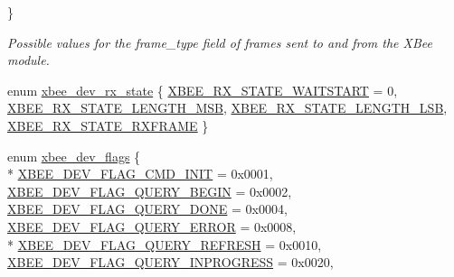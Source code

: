 \begin{DoxyCompactItemize}
 \}
\begin{DoxyCompactList}\small\item\em Possible values for the {\ttfamily frame\-\_\-type} field of frames sent to and from the X\-Bee module. \end{DoxyCompactList}\item 
enum \hyperlink{group__xbee__device_ga30374ada0aff261c5da7557882fd09de}{xbee\-\_\-dev\-\_\-rx\-\_\-state} \{ \hyperlink{group__xbee__device_gga30374ada0aff261c5da7557882fd09deae0a149adbaecdd2c5d84a1ed006e01a3}{X\-B\-E\-E\-\_\-\-R\-X\-\_\-\-S\-T\-A\-T\-E\-\_\-\-W\-A\-I\-T\-S\-T\-A\-R\-T} = 0, 
\hyperlink{group__xbee__device_gga30374ada0aff261c5da7557882fd09dea641dccc2bf7a54d9108a7d3a1aa94dfc}{X\-B\-E\-E\-\_\-\-R\-X\-\_\-\-S\-T\-A\-T\-E\-\_\-\-L\-E\-N\-G\-T\-H\-\_\-\-M\-S\-B}, 
\hyperlink{group__xbee__device_gga30374ada0aff261c5da7557882fd09deafc90aadcdd6ea17637198aadd9d85efd}{X\-B\-E\-E\-\_\-\-R\-X\-\_\-\-S\-T\-A\-T\-E\-\_\-\-L\-E\-N\-G\-T\-H\-\_\-\-L\-S\-B}, 
\hyperlink{group__xbee__device_gga30374ada0aff261c5da7557882fd09deae7792cb93b09dde7b061947daffcb35a}{X\-B\-E\-E\-\_\-\-R\-X\-\_\-\-S\-T\-A\-T\-E\-\_\-\-R\-X\-F\-R\-A\-M\-E}
 \}
\item 
enum \hyperlink{group__xbee__device_ga80478d6b87ebdf34b5ec06e5ca6f309e}{xbee\-\_\-dev\-\_\-flags} \{ \\*
\hyperlink{group__xbee__device_gga80478d6b87ebdf34b5ec06e5ca6f309ea7227a8ae75aa792a17e24d20f1a5a4a8}{X\-B\-E\-E\-\_\-\-D\-E\-V\-\_\-\-F\-L\-A\-G\-\_\-\-C\-M\-D\-\_\-\-I\-N\-I\-T} = 0x0001, 
\hyperlink{group__xbee__device_gga80478d6b87ebdf34b5ec06e5ca6f309ea28b7d1589252302b80f10a627656a6c5}{X\-B\-E\-E\-\_\-\-D\-E\-V\-\_\-\-F\-L\-A\-G\-\_\-\-Q\-U\-E\-R\-Y\-\_\-\-B\-E\-G\-I\-N} = 0x0002, 
\hyperlink{group__xbee__device_gga80478d6b87ebdf34b5ec06e5ca6f309ead04b8cb5ede9e940335559b26aa5399f}{X\-B\-E\-E\-\_\-\-D\-E\-V\-\_\-\-F\-L\-A\-G\-\_\-\-Q\-U\-E\-R\-Y\-\_\-\-D\-O\-N\-E} = 0x0004, 
\hyperlink{group__xbee__device_gga80478d6b87ebdf34b5ec06e5ca6f309ea7dbd64bc34a6a405582cc92d6460921a}{X\-B\-E\-E\-\_\-\-D\-E\-V\-\_\-\-F\-L\-A\-G\-\_\-\-Q\-U\-E\-R\-Y\-\_\-\-E\-R\-R\-O\-R} = 0x0008, 
\\*
\hyperlink{group__xbee__device_gga80478d6b87ebdf34b5ec06e5ca6f309ea08b02fa597f36fd613370d28ab5a0e81}{X\-B\-E\-E\-\_\-\-D\-E\-V\-\_\-\-F\-L\-A\-G\-\_\-\-Q\-U\-E\-R\-Y\-\_\-\-R\-E\-F\-R\-E\-S\-H} = 0x0010, 
\hyperlink{group__xbee__device_gga80478d6b87ebdf34b5ec06e5ca6f309ea5f1d6c0ecfad680a292b57e8b078e357}{X\-B\-E\-E\-\_\-\-D\-E\-V\-\_\-\-F\-L\-A\-G\-\_\-\-Q\-U\-E\-R\-Y\-\_\-\-I\-N\-P\-R\-O\-G\-R\-E\-S\-S} = 0x0020, 

\end{DoxyCompactItemize}
